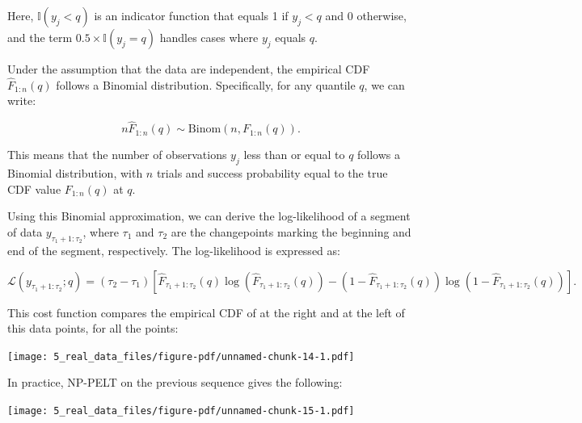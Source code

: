 \documentclass[
  letterpaper,
  DIV=11,
  numbers=noendperiod]{scrreprt}
\newenvironment{Shaded}{\begin{snugshade}}{\end{snugshade}}
\newcommand{\AttributeTok}[1]{\textcolor[rgb]{0.40,0.45,0.13}{#1}}
\newcommand{\DecValTok}[1]{\textcolor[rgb]{0.68,0.00,0.00}{#1}}
\newcommand{\FunctionTok}[1]{\textcolor[rgb]{0.28,0.35,0.67}{#1}}
\newcommand{\NormalTok}[1]{\textcolor[rgb]{0.00,0.23,0.31}{#1}}
\newcommand{\OtherTok}[1]{\textcolor[rgb]{0.00,0.23,0.31}{#1}}
\newcommand{\SpecialCharTok}[1]{\textcolor[rgb]{0.37,0.37,0.37}{#1}}
\newcommand{\StringTok}[1]{\textcolor[rgb]{0.13,0.47,0.30}{#1}}
\begin{document}
Here, \(\mathbb{I}(y_j < q)\) is an indicator function that equals 1 if
\(y_j < q\) and 0 otherwise, and the term
\(0.5 \times \mathbb{I}(y_j = q)\) handles cases where \(y_j\) equals
\(q\).

Under the assumption that the data are independent, the empirical CDF
\(\hat{F}_{1:n}(q)\) follows a Binomial distribution. Specifically, for
any quantile \(q\), we can write:

\[
n\hat{F}_{1:n}(q) \sim \mathrm{Binom}(n, F_{1:n}(q)).
\]

This means that the number of observations \(y_j\) less than or equal to
\(q\) follows a Binomial distribution, with \(n\) trials and success
probability equal to the true CDF value \(F_{1:n}(q)\) at \(q\).

Using this Binomial approximation, we can derive the log-likelihood of a
segment of data \(y_{\tau_1+1:\tau_2}\), where \(\tau_1\) and \(\tau_2\)
are the changepoints marking the beginning and end of the segment,
respectively. The log-likelihood is expressed as:

\[
\mathcal{L}(y_{\tau_1+1:\tau_2}; q) = (\tau_2 - \tau_1) \left[\hat{F}_{\tau_1+1:\tau_2}(q) \log(\hat{F}_{\tau_1+1:\tau_2}(q)) - (1-\hat{F}_{\tau_1+1:\tau_2}(q))\log(1-\hat{F}_{\tau_1+1:\tau_2}(q)) \right].
\]

This cost function compares the empirical CDF of at the right and at the
left of this data points, for all the points:

\texttt{[image: 5\_real\_data\_files/figure-pdf/unnamed-chunk-14-1.pdf]}

In practice, NP-PELT on the previous sequence gives the following:

\begin{Shaded}
\end{Shaded}

\texttt{[image: 5\_real\_data\_files/figure-pdf/unnamed-chunk-15-1.pdf]}
\end{document}
